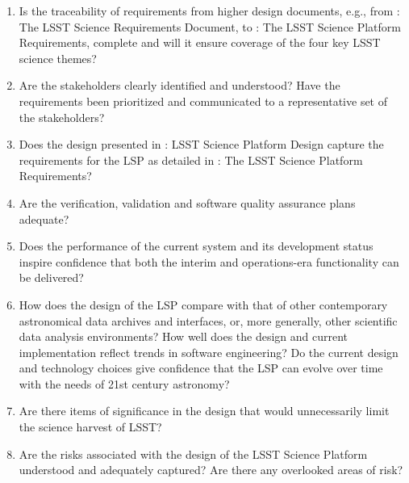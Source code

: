 \documentclass[DM,lsstdraft,STS,toc]{lsstdoc}
\begin{document}
\begin{enumerate}
\item Is the traceability of requirements from higher design documents, e.g., from : The LSST Science Requirements Document,
to : The LSST Science Platform Requirements, complete and will it ensure coverage of the four key LSST science themes?
%
\item Are the stakeholders clearly identified and understood? Have the requirements been prioritized and communicated to a representative set of the stakeholders?
%
\item Does the design presented in : LSST Science Platform Design capture the requirements for the LSP as detailed in : The LSST Science Platform Requirements?
%
\item Are the verification, validation and software quality assurance plans adequate?
%
\item Does the performance of the current system and its development status inspire confidence that both the interim and operations-era functionality can be delivered?
%
\item How does the design of the LSP compare with that of other contemporary astronomical data archives and interfaces, or, more generally, other scientific data analysis environments? How well does the design and current implementation reflect trends in software engineering? Do the current design and technology choices give confidence that the LSP can evolve over time with the needs of 21st century astronomy?
%
\item Are there items of significance in the design that would unnecessarily limit the science harvest of LSST?
%
\item Are the risks associated with the design of the LSST Science Platform understood and adequately captured? Are there any overlooked areas of risk?

\end{enumerate}
\end{document}
